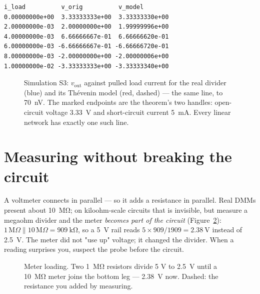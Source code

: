\begin{lstlisting}[language={},caption={Verification output, verbatim — every 4th row shown of 21 simulated rows: load current, $v_{\mathrm{out}}$ of the real divider, $v_{\mathrm{out}}$ of the Th\'evenin model. Column 3 minus column 2 never exceeds \qty{7e-8}{\volt} on any row.},label=lst:thevout]
i_load          v_orig          v_model
0.00000000e+00  3.33333333e+00  3.33333330e+00
2.00000000e-03  2.00000000e+00  1.99999996e+00
4.00000000e-03  6.66666667e-01  6.66666620e-01
6.00000000e-03 -6.66666667e-01 -6.66666720e-01
8.00000000e-03 -2.00000000e+00 -2.00000006e+00
1.00000000e-02 -3.33333333e+00 -3.33333340e+00
\end{lstlisting}

\begin{figure}[htbp]
\centering

\caption{Simulation S3: $v_{\mathrm{out}}$ against pulled load current for the
real divider (blue) and its Th\'evenin model (red, dashed) — the same line,
to \qty{70}{\nano\volt}. The marked endpoints are the theorem's two handles:
open-circuit voltage \qty{3.33}{\volt} and short-circuit current
\qty{5}{\milli\ampere}. Every linear network has exactly one such line.}
\label{fig:loadline}
\end{figure}

\section{Measuring without breaking the circuit}
\label{sec:meterloading}

A voltmeter connects in parallel — so it adds a resistance in parallel.
Real DMMs present about \qty{10}{\mega\ohm}; on
kiloohm-scale circuits that is invisible, but measure a megaohm divider and
the meter \emph{becomes part of the circuit}
(Figure~\ref{fig:meter}): $1\,\mathrm{M}\Omega \| 10\,\mathrm{M}\Omega =
\qty{909}{\kilo\ohm}$, so a \qty{5}{\volt} rail reads $5\times909/1909 =
\qty{2.38}{\volt}$ instead of \qty{2.5}{\volt}. The meter did not "use up"
voltage; it changed the divider. When a reading surprises you, suspect the
probe before the circuit.

\begin{figure}[htbp]
\centering

\caption{Meter loading. Two \qty{1}{\mega\ohm} resistors divide 5 V to
\qty{2.5}{\volt} until a \qty{10}{\mega\ohm} meter joins the bottom leg —
\qty{2.38}{\volt} now. Dashed: the resistance you added by measuring.}
\label{fig:meter}
\end{figure}

